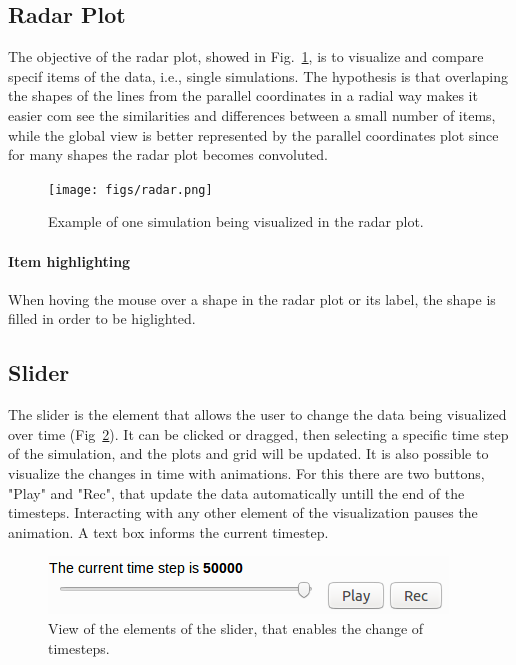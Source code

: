 \documentclass[10pt, conference]{IEEEtran}
\begin{document}
\subsection{Radar Plot}

The objective of the radar plot, showed in Fig.~\ref{fig:radar}, is to visualize and compare specif items of the data, i.e., single simulations. The hypothesis is that overlaping the shapes of the lines from the parallel coordinates in a radial way makes it easier com see the similarities and differences between a small number of items, while the global view is better represented by the parallel coordinates plot since for many shapes the radar plot becomes convoluted.  

\begin{figure}
\texttt{[image: figs/radar.png]}
\caption{Example of one simulation being visualized in the radar plot.} 
\label{fig:radar}
\end{figure}
\paragraph*{Item highlighting} When hoving the mouse over a shape in the radar plot or its label, the shape is filled in order to be higlighted.

\subsection{Slider}

The slider is the element that allows the user to change the data being visualized over time (Fig~\ref{fig:slider}). It can be clicked or dragged, then selecting a specific time step of the simulation, and the plots and grid will be updated. It is also possible to visualize the changes in time with animations. For this there are two buttons, "Play" and "Rec", that update the data automatically untill the end of the timesteps. Interacting with any other element of the visualization pauses the animation. A text box informs the current timestep.

\begin{figure}
\includegraphics[width=0.8\linewidth]{figs/slider.png}
\caption{View of the elements of the slider, that enables the change of timesteps.} 
\label{fig:slider}
\end{figure}
\end{document}
